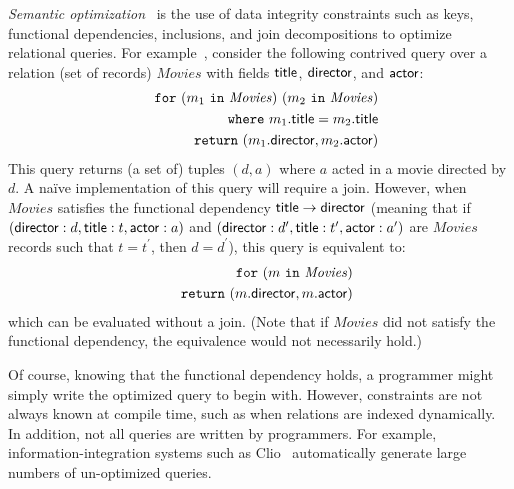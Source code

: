 \documentclass[preprint]{sigplanconf}
\newcommand{\FOR}{{\tt for} \ }
\newcommand{\WHERE}{{\tt where} \ }
\newcommand{\IN}{ \ {\tt in} \ }
\newcommand{\RETURN}{{\tt return} \ }
\newcommand{\greg}[1]{\textcolor{blue}{GREG: #1}}
\newcommand{\relation}[1]{\ensuremath{\mathit{#1}}\xspace}
\begin{document}
{\it Semantic optimization}~\cite{foundations,Deutsch:2006:QRC:1121995.1122010,Popa99anequational} is the 
use of data integrity constraints such as keys, functional dependencies, inclusions, and join decompositions to optimize relational queries. For example~\cite{foundations}, consider the following contrived query over a relation (set of records) \relation{Movies} 
with fields ${\sf title}$, ${\sf director}$, and ${\sf actor}$:
\begin{eqnarray*}
& & \FOR (m_1 \IN \relation{Movies}) \ (m_2 \IN \relation{Movies}) \\
 & & \WHERE m_1.{\sf title} = m_2.{\sf title} \\
 & & \RETURN (m_1.{\sf director}, m_2.{\sf actor})
\end{eqnarray*}        
This query returns (a set of) tuples $(d,a)$ where $a$ acted in a movie directed by $d$.  A na\"ive implementation of this query will require a join.  However, when \relation{Movies} satisfies the functional dependency ${\sf title} \to {\sf director}$ (meaning that 
if $({\sf director}: d, {\sf title}: t, {\sf actor}: a)$ and $({\sf director}: d^\prime, {\sf title}: t^\prime, {\sf actor}: a^\prime)$ are \relation{Movies} records such that $t = t^\prime$, then $d = d^\prime$), this query is equivalent to:
\begin{eqnarray*}
& & \FOR (m \IN \relation{Movies}) \\
 & & \RETURN (m.{\sf director}, m.{\sf actor})
 \end{eqnarray*}
which can be evaluated without a join.  (Note that if \relation{Movies} did not satisfy the functional dependency, the equivalence would not necessarily hold.)  

Of course, knowing that the functional dependency holds, a programmer might simply write the optimized query to begin with.
However, constraints are not always known at compile time, such as when relations are indexed dynamically.
In addition, not all queries are written by programmers.
For example, information-integration systems such as Clio~\cite{haas:clio} automatically generate large numbers of un-optimized queries. %
\end{document}

